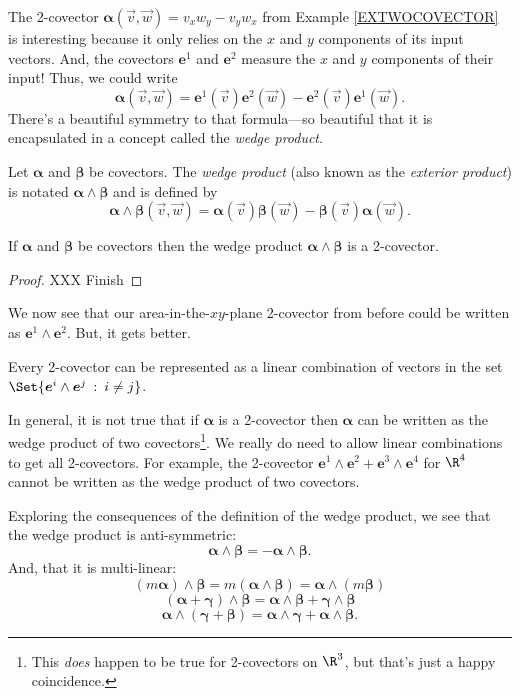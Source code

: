 The 2-covector $\bm\alpha(\vec v,\vec w) = v_xw_y-v_yw_x$ from Example \ref{EXTWOCOVECTOR}
is interesting because it only relies on the $x$ and $y$ components of its
input vectors. And, the covectors $\bm e^1$ and $\bm e^2$ measure the $x$ and
$y$ components of their input!  Thus, we could write
\[
	\bm\alpha(\vec v,\vec w) = \bm e^1(\vec v)\bm e^2(\vec w) - \bm e^2(\vec v)\bm{e}^1(\vec w).
\]
There's a beautiful symmetry to that formula---so beautiful that it is encapsulated
in a concept called the \emph{wedge product}.

\begin{definition}
	Let $\bm \alpha$ and $\bm \beta$ be covectors.  The \emph{wedge product}
	(also known as the \emph{exterior product})
	is notated $\bm\alpha\wedge\bm\beta$ and is defined by
	\[
		\bm\alpha\wedge\bm\beta (\vec v,\vec w)
		=\bm\alpha(\vec v)\bm\beta(\vec w) - \bm\beta(\vec v)\bm\alpha(\vec w).
	\]
\end{definition}

\begin{theorem}
	If $\bm \alpha$ and $\bm \beta$ be covectors then the wedge
	product $\bm\alpha\wedge\bm\beta$ is a 2-covector.
\end{theorem}
\begin{proof}
 	XXX Finish
\end{proof}

We now see that our area-in-the-$xy$-plane 2-covector from before could
be written as $\bm e^1\wedge \bm e^2$.  But, it gets better.

\begin{theorem}
	Every 2-covector can be represented as a linear combination
	of vectors in the set $\Set{\bm e^i\wedge \bm e^j\given i\neq j}$.
\end{theorem}

In general, it is not true that if $\bm\alpha$ is a 2-covector
then $\bm\alpha$ can be written as the wedge product of two covectors\footnote{
This \emph{does} happen to be true for 2-covectors on $\R^3$, but that's just
a happy coincidence.}.  
We really do need to allow linear combinations to get 
all 2-covectors.  For example, the 2-covector $\bm e^1\wedge\bm e^2+\bm e^3\wedge
\bm e^4$ for $\R^4$ cannot be written as the wedge product of two covectors.

\bigskip
Exploring the consequences of the definition of the wedge product, 
we see that the wedge product is anti-symmetric:
\[
	\bm\alpha\wedge \bm \beta = -\bm\alpha\wedge \bm\beta.
\]
And, that it is multi-linear:
\[
	(m\bm\alpha)\wedge \bm \beta = m(\bm\alpha\wedge \bm \beta)
	=\bm\alpha\wedge (m \bm \beta)
\]
\[
	(\bm\alpha+\bm\gamma)\wedge \bm\beta = \bm\alpha\wedge\bm\beta + \bm\gamma\wedge \bm\beta
\]
\[
	\bm\alpha\wedge(\bm\gamma+\bm\beta) = \bm\alpha\wedge\bm\gamma + \bm\alpha\wedge\bm\beta.
\]


